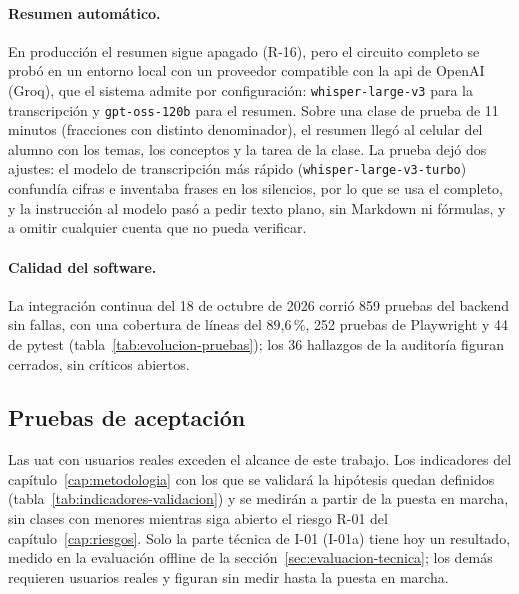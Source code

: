 \paragraph{Resumen automático.} En producción el resumen sigue
apagado (R-16), pero el circuito completo se probó en un entorno local
con un proveedor compatible con la \gls{api} de OpenAI (Groq), que el
sistema admite por configuración: \texttt{whisper-large-v3} para la
transcripción y \texttt{gpt-oss-120b} para el resumen. Sobre una clase
de prueba de 11 minutos (fracciones con distinto denominador), el
resumen llegó al celular del alumno con los temas, los conceptos y la
tarea de la clase. La prueba dejó dos ajustes: el modelo de
transcripción más rápido (\texttt{whisper-large-v3-turbo}) confundía
cifras e inventaba frases en los silencios, por lo que se usa el
completo, y la instrucción al modelo pasó a pedir texto plano, sin
Markdown ni fórmulas, y a omitir cualquier cuenta que no pueda
verificar.

\paragraph{Calidad del software.} La integración continua del 18 de
octubre de 2026 corrió 859 pruebas del backend sin fallas, con una
cobertura de líneas del 89,6\,\%, 252 pruebas de Playwright y 44 de
pytest (tabla~\ref{tab:evolucion-pruebas}); los 36 hallazgos de la
auditoría figuran cerrados, sin críticos abiertos.

\subsection{Pruebas de aceptación}

Las \gls{uat} con usuarios reales exceden el
alcance de este trabajo. Los indicadores del capítulo~\ref{cap:metodologia}
con los que se validará la hipótesis quedan definidos
(tabla~\ref{tab:indicadores-validacion}) y se medirán a partir de la
puesta en marcha, sin clases con menores mientras siga abierto el riesgo
R-01 del capítulo~\ref{cap:riesgos}. Solo la parte técnica de I-01
(I-01a) tiene hoy un resultado, medido en la evaluación
offline de la sección~\ref{sec:evaluacion-tecnica}; los demás requieren
usuarios reales y figuran sin medir hasta la puesta en marcha.

